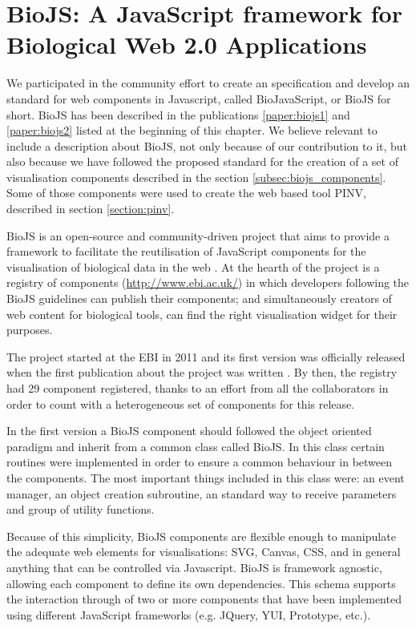 \section{BioJS: A JavaScript framework for Biological Web 2.0 Applications }
We participated in the community effort to create an specification and develop an standard for web components in Javascript, called BioJavaScript, or BioJS for short. BioJS has been described in the publications \ref{paper:biojs1} and \ref{paper:biojs2} listed at the beginning of this chapter. We believe relevant to include a description about BioJS, not only because of our contribution to it, but also because we have followed the proposed standard for the creation of a set of visualisation components described in the section \ref{subsec:biojs_components}. Some of those components were used to create the web based tool PINV, described in section \ref{section:pinv}.

BioJS is an open-source and community-driven project that aims to provide a framework to facilitate the reutilisation of JavaScript components for the visualisation of biological data in the web \cite{GOM2013}. At the hearth of the project is a registry of components (\url{http://www.ebi.ac.uk/}) in which developers following the BioJS guidelines can publish their components; and simultaneously creators of web content for biological tools, can find the right visualisation widget for their purposes.

The project started at the EBI in 2011 and its first version was officially released when the first publication about the project was written \cite{GOM2013}. By then, the registry had 29 component registered, thanks to an effort from all the collaborators in order to count with a heterogeneous set of components for this release.

In the first version a BioJS component should followed the object oriented paradigm and inherit from a common class called BioJS. In this class certain routines were implemented in order to ensure a common behaviour in between the components. The most important things included in this class were: an event manager, an object creation subroutine, an standard way to receive parameters and group of utility functions.

Because of this simplicity, BioJS components are flexible enough to manipulate the adequate web elements for visualisations: SVG, Canvas, CSS, and in general anything that can be controlled via Javascript. BioJS is framework agnostic, allowing each component to define its own dependencies. This schema supports the interaction through of two or more components that have been implemented using different JavaScript frameworks (e.g. JQuery, YUI, Prototype, etc.).
 
